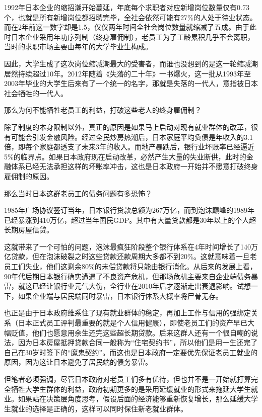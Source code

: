 1992年日本企业的缩招潮开始蔓延，年底每个求职者对应新增岗位数量仅有0.73个，也就是所有新增岗位都招聘完毕，全社会依然可能有27\%的人处于待业状态。而在2年前这一数字却是1.5，仅仅两年时间全社会岗位数量就缩减了五成。由于此时日本企业采用年功序列制（终身雇佣制），老员工为了工龄累积几乎不会离职，当时的求职市场主要由每年的大学毕业生构成。

因此，大学生成了这次岗位缩减潮最大的受害者，而谁也没想到的是这一轮缩减潮居然持续超过10年。2012年随着《失落的二十年》一书爆火，这一批从1993年至2003年毕业的大学生后来有了一个统一的名字，那就是失落的一代人，意指被日本社会牺牲的一代人。

那么为何不能牺牲老员工的利益，打破这些老人的终身雇佣制？

除了制度的本身限制以外，真正的原因是如果马上启动对现有就业群体的改革，很有可能会引发金融风险。经过全民炒房热潮后，日本家庭平均负债是年收入的3.1倍，即每个家庭都透支了未来3年的收入。而地产暴跌后，银行业坏账率已经逼近5\%的临界点。如果日本政府现在启动改革，必然产生大量的失业断供，此时的金融体系已经无法承担这样的坏账率冲击，这也是日本政府一开始并不愿意打破终身雇佣制的原因。

那么当时日本这群老员工的债务问题有多恐怖？

1985年广场协议签订当年，日本银行贷款总额为267万亿，而到泡沫巅峰的1989年已经暴涨到410万亿，超过当年国民GDP。其中有大量贷款都是30年以上的个人超长期房屋信贷。

这就带来了一个可怕的问题，泡沫最疯狂阶段整个银行体系在4年时间增长了140万亿贷款，但在泡沫破裂之时这些贷款还款周期大多都不到20\%。这就意味着一旦老员工们失业，他们这剩余80\%的未偿贷款将只能由银行消化。从后来的发展上看，90年代后期日本银行确实遭遇了不良资产危机，但那场危机主要来自企业端债务暴雷，就这已经让银行业元气大伤，全行业在2010年后才逐渐走出衰退影响。试想一下，如果企业端与居民端同时暴雷，日本银行体系大概率将尸骨无存。

也正是由于日本政府维系住了现有就业群体的稳定，再加上工作与信用的强绑定关系（日本正式员工评判最重要的就是个人信用健康），即使老员工们的资产早已大幅贬值，他们也愿意用余生还完这些超长期贷款。后来这群人还有一个很自嘲的说法，因为日本房屋抵押贷款合同一般称为“住宅契约书”，所以他们是用一生还完了自己在30岁时签下的“魔鬼契约”。而这也是日本政府一定要优先保证老员工就业的原因，因为这让日本避免了居民端的债务暴雷。

但笔者必须强调，尽管日本政府对老员工们多有优待，但也并不是一开始就打算完全牺牲大学生群体的利益，政府初期更多的是采用延缓就业的形式来拖延大学生就业。如果站在决策层角度思考，假设后面的经济能够重新恢复增长，那么延缓大学生就业的选择是正确的，这样可以同时保住新老就业群体。

